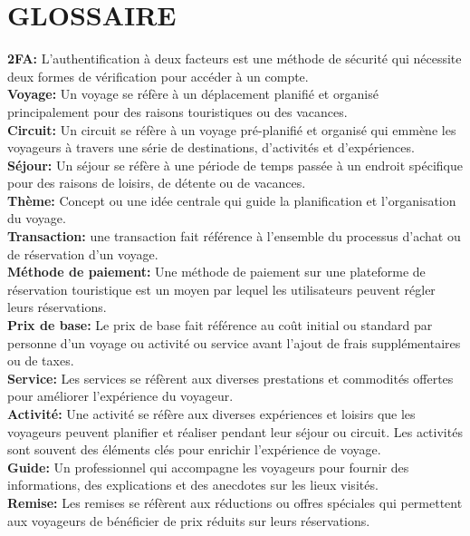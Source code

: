 \documentclass[12pt]{report}
\begin{document}
			\chapter*{GLOSSAIRE}
			
			\textbf{2FA:} L’authentification à deux facteurs est une méthode de sécurité qui nécessite deux formes de vérification pour accéder à un compte.\\
			\textbf{Voyage:} Un voyage se réfère à un déplacement planifié et organisé principalement pour des raisons touristiques ou des vacances.\\
			\textbf{Circuit:} Un circuit se réfère à un voyage pré-planifié et organisé qui emmène les voyageurs à travers une série de destinations, d'activités et d'expériences.\\
			\textbf{Séjour:} Un séjour se réfère à une période de temps passée à un endroit spécifique pour des raisons de loisirs, de détente ou de vacances.\\
			\textbf{Thème:} Concept ou une idée centrale qui guide la planification et l'organisation du voyage.\\
			\textbf{Transaction:} une transaction fait référence à l'ensemble du processus d'achat ou de réservation d'un voyage.\\
			\textbf{Méthode de paiement:} Une méthode de paiement sur une plateforme de réservation touristique est un moyen par lequel les utilisateurs peuvent régler leurs réservations.\\
			\textbf{Prix de base:} Le prix de base fait référence au coût initial ou standard par personne d'un voyage ou activité ou service avant l'ajout de frais supplémentaires ou de taxes.\\
			\textbf{Service:} Les services se réfèrent aux diverses prestations et commodités offertes pour améliorer l'expérience du voyageur.\\
			\textbf{Activité:} Une activité se réfère aux diverses expériences et loisirs que les voyageurs peuvent planifier et réaliser pendant leur séjour ou circuit. Les activités sont souvent des éléments clés pour enrichir l'expérience de voyage.\\
			\textbf{Guide:} Un professionnel qui accompagne les voyageurs pour fournir des informations, des explications et des anecdotes sur les lieux visités.\\
			\textbf{Remise:} Les remises se réfèrent aux réductions ou offres spéciales qui permettent aux voyageurs de bénéficier de prix réduits sur leurs réservations.\\
\end{document}
